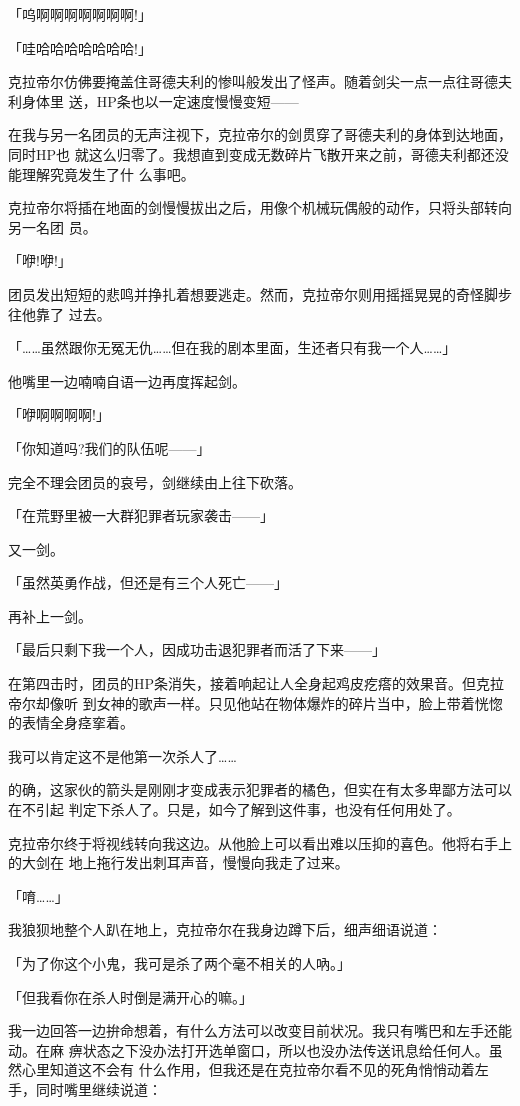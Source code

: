 \documentclass[11pt]{book}
\begin{document}
「呜啊啊啊啊啊啊啊!」

「哇哈哈哈哈哈哈哈!」

克拉帝尔仿佛要掩盖住哥德夫利的惨叫般发出了怪声。随着剑尖一点一点往哥德夫利身体里
送，HP条也以一定速度慢慢变短——

在我与另一名团员的无声注视下，克拉帝尔的剑贯穿了哥德夫利的身体到达地面，同时HP也
就这么归零了。我想直到变成无数碎片飞散开来之前，哥德夫利都还没能理解究竟发生了什
么事吧。

克拉帝尔将插在地面的剑慢慢拔出之后，用像个机械玩偶般的动作，只将头部转向另一名团
员。

「咿!咿!」

团员发出短短的悲鸣并挣扎着想要逃走。然而，克拉帝尔则用摇摇晃晃的奇怪脚步往他靠了
过去。

「……虽然跟你无冤无仇……但在我的剧本里面，生还者只有我一个人……」

他嘴里一边喃喃自语一边再度挥起剑。

「咿啊啊啊啊!」

「你知道吗?我们的队伍呢——」

完全不理会团员的哀号，剑继续由上往下砍落。

「在荒野里被一大群犯罪者玩家袭击——」

又一剑。

「虽然英勇作战，但还是有三个人死亡——」

再补上一剑。

「最后只剩下我一个人，因成功击退犯罪者而活了下来——」

在第四击时，团员的HP条消失，接着响起让人全身起鸡皮疙瘩的效果音。但克拉帝尔却像听
到女神的歌声一样。只见他站在物体爆炸的碎片当中，脸上带着恍惚的表情全身痉挛着。

我可以肯定这不是他第一次杀人了……

的确，这家伙的箭头是刚刚才变成表示犯罪者的橘色，但实在有太多卑鄙方法可以在不引起
判定下杀人了。只是，如今了解到这件事，也没有任何用处了。

克拉帝尔终于将视线转向我这边。从他脸上可以看出难以压抑的喜色。他将右手上的大剑在
地上拖行发出刺耳声音，慢慢向我走了过来。

「唷……」

我狼狈地整个人趴在地上，克拉帝尔在我身边蹲下后，细声细语说道：

「为了你这个小鬼，我可是杀了两个毫不相关的人吶。」

「但我看你在杀人时倒是满开心的嘛。」

我一边回答一边拚命想着，有什么方法可以改变目前状况。我只有嘴巴和左手还能动。在麻
痹状态之下没办法打开选单窗口，所以也没办法传送讯息给任何人。虽然心里知道这不会有
什么作用，但我还是在克拉帝尔看不见的死角悄悄动着左手，同时嘴里继续说道：
\end{document}
